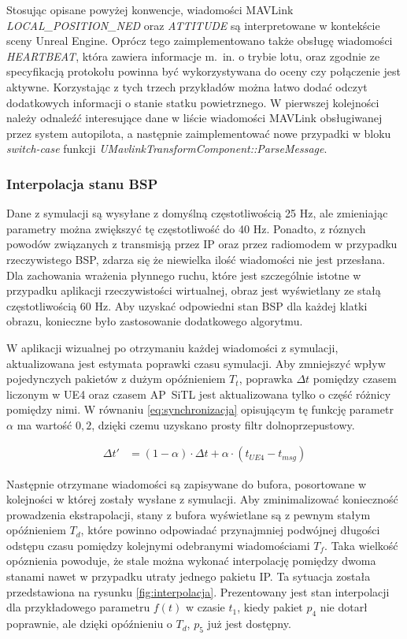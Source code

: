 Stosując opisane powyżej konwencje, wiadomości MAVLink \emph{LOCAL\_POSITION\_NED} oraz \emph{ATTITUDE} są interpretowane w kontekście sceny Unreal Engine. Oprócz tego zaimplementowano także obsługę wiadomości \emph{HEARTBEAT}, która zawiera informacje m.~in. o trybie lotu, oraz zgodnie ze specyfikacją protokołu powinna być wykorzystywana do oceny czy połączenie jest aktywne. Korzystając z tych trzech przykładów można łatwo dodać odczyt dodatkowych informacji o stanie statku powietrznego. W pierwszej kolejności należy odnaleźć interesujące dane w liście wiadomości MAVLink obsługiwanej przez system autopilota\cite{soft:mavcommon}, a następnie zaimplementować nowe przypadki w bloku \emph{switch-case} funkcji \emph{UMavlinkTransformComponent::ParseMessage}.

\subsubsection{Interpolacja stanu BSP}
Dane z symulacji są wysyłane z domyślną częstotliwością 25 Hz, ale zmieniając parametry można zwiększyć tę częstotliwość do 40 Hz. Ponadto, z róznych powodów związanych z transmisją przez IP oraz przez radiomodem w przypadku rzeczywistego BSP, zdarza się że niewielka ilość wiadomości nie jest przesłana. Dla zachowania wrażenia płynnego ruchu, które jest szczególnie istotne w przypadku aplikacji rzeczywistości wirtualnej, obraz jest wyświetlany ze stałą częstotliwością 60 Hz. Aby uzyskać odpowiedni stan BSP dla każdej klatki obrazu, konieczne było zastosowanie dodatkowego algorytmu.

W aplikacji wizualnej po otrzymaniu każdej wiadomości z symulacji, aktualizowana jest estymata poprawki czasu symulacji. Aby zmniejszyć wpływ pojedynczych pakietów z dużym opóźnieniem $ T_t $, poprawka $ \Delta t $ pomiędzy czasem liczonym w UE4 oraz czasem AP~SiTL jest aktualizowana tylko o część różnicy pomiędzy nimi. W równaniu \ref{eq:synchronizacja} opisującym tę funkcję parametr $ \alpha $ ma wartość $ 0,2 $, dzięki czemu uzyskano prosty filtr dolnoprzepustowy.

\begin{align}
    \label{eq:synchronizacja}
    \Delta t' &= (1 - \alpha) \cdot \Delta t + \alpha \cdot (t_{UE4} - t_{msg})
\end{align}

Następnie otrzymane wiadomości są zapisywane do bufora, posortowane w kolejności w której zostały wysłane z symulacji. Aby zminimalizować konieczność prowadzenia ekstrapolacji, stany z bufora wyświetlane są z pewnym stałym opóźnieniem $ T_d $, które powinno odpowiadać przynajmniej podwójnej długości odstępu czasu pomiędzy kolejnymi odebranymi wiadomościami $ T_f $. Taka wielkość opóznienia powoduje, że stale można wykonać interpolację pomiędzy dwoma stanami nawet w przypadku utraty jednego pakietu IP. Ta sytuacja została przedstawiona na rysunku \ref{fig:interpolacja}. Prezentowany jest stan interpolacji dla przykładowego parametru $ f(t) $ w czasie $ t_1 $, kiedy pakiet $ p_4 $ nie dotarł poprawnie, ale dzięki opóźnieniu o $ T_d $, $ p_5 $ już jest dostępny.

